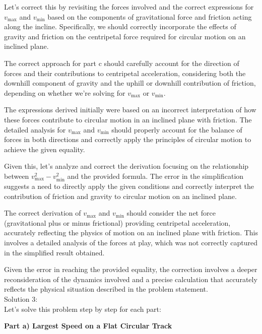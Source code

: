 \documentclass[a4paper,11pt]{article}
\begin{document}
Let's correct this by revisiting the forces involved and the correct expressions for \( v_{\text{max}} \) and \( v_{\text{min}} \) based on the components of gravitational force and friction acting along the incline. Specifically, we should correctly incorporate the effects of gravity and friction on the centripetal force required for circular motion on an inclined plane.

The correct approach for part c should carefully account for the direction of forces and their contributions to centripetal acceleration, considering both the downhill component of gravity and the uphill or downhill contribution of friction, depending on whether we're solving for \( v_{\text{max}} \) or \( v_{\text{min}} \).

The expressions derived initially were based on an incorrect interpretation of how these forces contribute to circular motion in an inclined plane with friction. The detailed analysis for \( v_{\text{max}} \) and \( v_{\text{min}} \) should properly account for the balance of forces in both directions and correctly apply the principles of circular motion to achieve the given equality.

Given this, let's analyze and correct the derivation focusing on the relationship between \( v_{\text{max}}^2 - v_{\text{min}}^2 \) and the provided formula. The error in the simplification suggests a need to directly apply the given conditions and correctly interpret the contribution of friction and gravity to circular motion on an inclined plane. 

The correct derivation of \( v_{\text{max}} \) and \( v_{\text{min}} \) should consider the net force (gravitational plus or minus frictional) providing centripetal acceleration, accurately reflecting the physics of motion on an inclined plane with friction. This involves a detailed analysis of the forces at play, which was not correctly captured in the simplified result obtained. 

Given the error in reaching the provided equality, the correction involves a deeper reconsideration of the dynamics involved and a precise calculation that accurately reflects the physical situation described in the problem statement. \\

\noindent Solution 3: \\

Let's solve this problem step by step for each part:

\textbf{Part a) Largest Speed on a Flat Circular Track}
\end{document}
